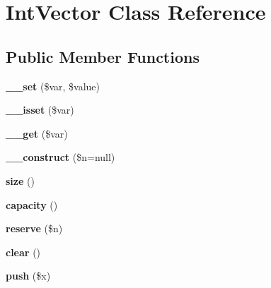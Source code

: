 \hypertarget{class_int_vector}{\section{Int\-Vector Class Reference}
\label{class_int_vector}
}
\subsection*{Public Member Functions}
\begin{DoxyCompactItemize}
\item 
\hypertarget{class_int_vector_af809cb86d569785c18fd1bab9a11eaf7}{{\bfseries \-\_\-\-\_\-set} (\$var, \$value)}\label{class_int_vector_af809cb86d569785c18fd1bab9a11eaf7}

\item 
\hypertarget{class_int_vector_aa8eff7938e63bd32ee72857fdd42fe12}{{\bfseries \-\_\-\-\_\-isset} (\$var)}\label{class_int_vector_aa8eff7938e63bd32ee72857fdd42fe12}

\item 
\hypertarget{class_int_vector_ad5fec30659925d38cf8298f763bb1730}{{\bfseries \-\_\-\-\_\-get} (\$var)}\label{class_int_vector_ad5fec30659925d38cf8298f763bb1730}

\item 
\hypertarget{class_int_vector_a9d387b990133ef723cc2cb64f1416f66}{{\bfseries \-\_\-\-\_\-construct} (\$n=null)}\label{class_int_vector_a9d387b990133ef723cc2cb64f1416f66}

\item 
\hypertarget{class_int_vector_a1ecde9cbf1ed58ccaf5ebb1c8d219ffe}{{\bfseries size} ()}\label{class_int_vector_a1ecde9cbf1ed58ccaf5ebb1c8d219ffe}

\item 
\hypertarget{class_int_vector_a9c4a53b76099441158639df30d2997c4}{{\bfseries capacity} ()}\label{class_int_vector_a9c4a53b76099441158639df30d2997c4}

\item 
\hypertarget{class_int_vector_a73cc6d7dc233a78baab9aee614ceca47}{{\bfseries reserve} (\$n)}\label{class_int_vector_a73cc6d7dc233a78baab9aee614ceca47}

\item 
\hypertarget{class_int_vector_a32c67e5dfea0b726dc4a3cb6a436a569}{{\bfseries clear} ()}\label{class_int_vector_a32c67e5dfea0b726dc4a3cb6a436a569}

\item 
\hypertarget{class_int_vector_a808036e88fdd4a2874da4a12700bc3d7}{{\bfseries push} (\$x)}\label{class_int_vector_a808036e88fdd4a2874da4a12700bc3d7}


\end{DoxyCompactItemize}

